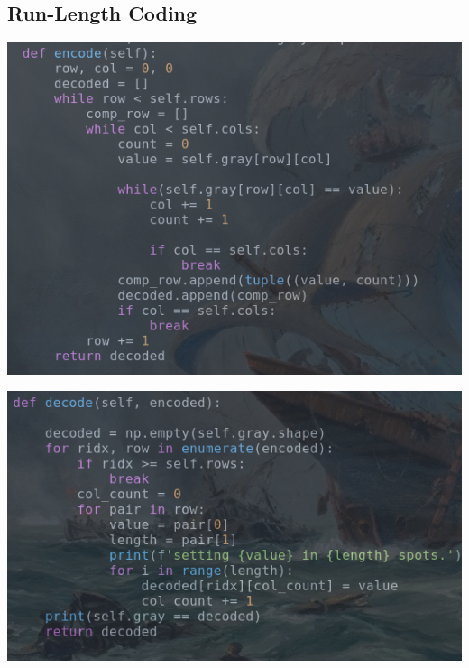 \documentclass{article}
\begin{document}
\subsection{Run-Length Coding}
%
\includegraphics[scale=.60]{rlc1.png}

\includegraphics[scale=.60]{rlc2.png}
\end{document}
